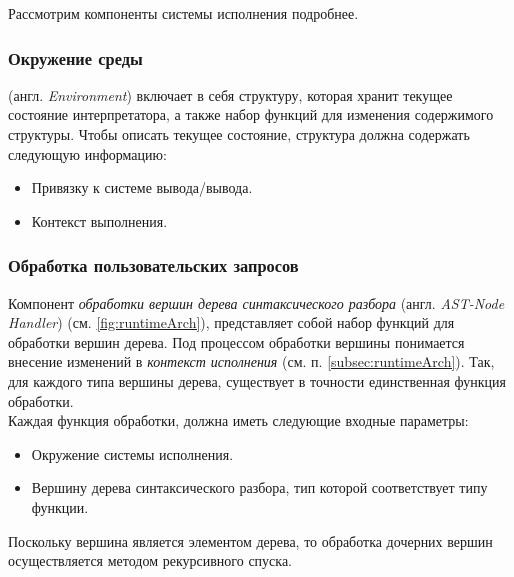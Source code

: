 \documentclass[12pt]{article}
\begin{document}
			\indent Рассмотрим компоненты системы исполнения подробнее. 
			
			\subsubsection{Окружение среды}
			 (англ. {\it Environment}) включает в себя структуру, которая хранит текущее состояние интерпретатора, а также набор функций для изменения содержимого структуры. Чтобы описать текущее состояние, структура должна содержать следующую информацию:
			\begin{itemize}
				\item Привязку к системе вывода/вывода.
				\item Контекст выполнения.
			\end{itemize}

			\subsubsection{Обработка пользовательских запросов}
			\hspace{\parindent} Компонент {\it обработки вершин дерева синтаксического разбора} (англ. {\it AST-Node Handler}) (см. \ref{fig:runtimeArch}), представляет собой набор функций для обработки вершин дерева. Под процессом обработки вершины понимается внесение изменений в {\it контекст исполнения} (см. п. \ref{subsec:runtimeArch}). Так, для каждого типа вершины дерева, существует в точности единственная функция обработки. \\
			\indent Каждая функция обработки, должна иметь следующие входные параметры:
			\begin{itemize}
				\item Окружение системы исполнения.
				\item Вершину дерева синтаксического разбора, тип которой соответствует типу функции.
			\end{itemize}
			
			\indent Поскольку вершина является элементом дерева, то обработка дочерних вершин осуществляется методом рекурсивного спуска.
\end{document}
